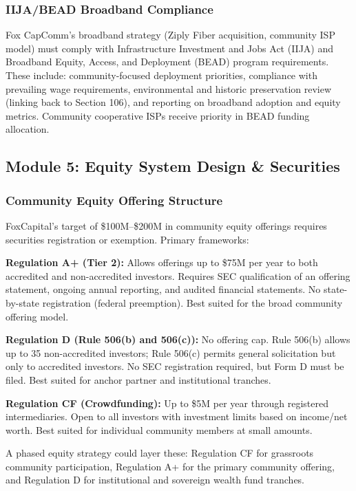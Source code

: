 \documentclass[11pt,letterpaper]{article}
\begin{document}
\subsubsection{IIJA/BEAD Broadband Compliance}

Fox CapComm's broadband strategy (Ziply Fiber acquisition, community ISP model) must comply with Infrastructure Investment and Jobs Act (IIJA) and Broadband Equity, Access, and Deployment (BEAD) program requirements. These include: community-focused deployment priorities, compliance with prevailing wage requirements, environmental and historic preservation review (linking back to Section 106), and reporting on broadband adoption and equity metrics. Community cooperative ISPs receive priority in BEAD funding allocation.

\subsection{Module 5: Equity System Design \& Securities}

\subsubsection{Community Equity Offering Structure}

FoxCapital's target of \$100M--\$200M in community equity offerings requires securities registration or exemption. Primary frameworks:

\textbf{Regulation A+ (Tier 2):} Allows offerings up to \$75M per year to both accredited and non-accredited investors. Requires SEC qualification of an offering statement, ongoing annual reporting, and audited financial statements. No state-by-state registration (federal preemption). Best suited for the broad community offering model.

\textbf{Regulation D (Rule 506(b) and 506(c)):} No offering cap. Rule 506(b) allows up to 35 non-accredited investors; Rule 506(c) permits general solicitation but only to accredited investors. No SEC registration required, but Form D must be filed. Best suited for anchor partner and institutional tranches.

\textbf{Regulation CF (Crowdfunding):} Up to \$5M per year through registered intermediaries. Open to all investors with investment limits based on income/net worth. Best suited for individual community members at small amounts.

A phased equity strategy could layer these: Regulation CF for grassroots community participation, Regulation A+ for the primary community offering, and Regulation D for institutional and sovereign wealth fund tranches.
\end{document}
